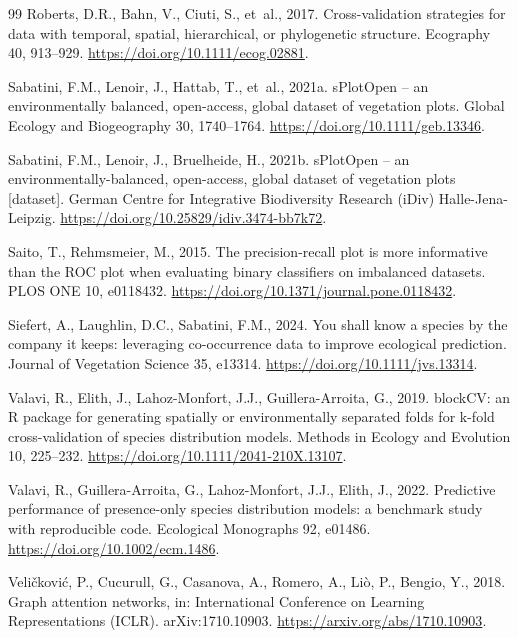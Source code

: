 \documentclass[a4paper,fleqn]{cas-sc}
\begin{document}
\begin{thebibliography}{99}
 Roberts, D.R., Bahn, V., Ciuti, S., et~al., 2017. Cross-validation strategies for data with temporal, spatial, hierarchical, or phylogenetic structure. Ecography 40, 913--929. \url{https://doi.org/10.1111/ecog.02881}.

 Sabatini, F.M., Lenoir, J., Hattab, T., et~al., 2021a. sPlotOpen -- an environmentally balanced, open-access, global dataset of vegetation plots. Global Ecology and Biogeography 30, 1740--1764. \url{https://doi.org/10.1111/geb.13346}.

 Sabatini, F.M., Lenoir, J., Bruelheide, H., 2021b. sPlotOpen -- an environmentally-balanced, open-access, global dataset of vegetation plots [dataset]. German Centre for Integrative Biodiversity Research (iDiv) Halle-Jena-Leipzig. \url{https://doi.org/10.25829/idiv.3474-bb7k72}.

 Saito, T., Rehmsmeier, M., 2015. The precision-recall plot is more informative than the ROC plot when evaluating binary classifiers on imbalanced datasets. PLOS ONE 10, e0118432. \url{https://doi.org/10.1371/journal.pone.0118432}.

 Siefert, A., Laughlin, D.C., Sabatini, F.M., 2024. You shall know a species by the company it keeps: leveraging co-occurrence data to improve ecological prediction. Journal of Vegetation Science 35, e13314. \url{https://doi.org/10.1111/jvs.13314}.

 Valavi, R., Elith, J., Lahoz-Monfort, J.J., Guillera-Arroita, G., 2019. blockCV: an R package for generating spatially or environmentally separated folds for k-fold cross-validation of species distribution models. Methods in Ecology and Evolution 10, 225--232. \url{https://doi.org/10.1111/2041-210X.13107}.

 Valavi, R., Guillera-Arroita, G., Lahoz-Monfort, J.J., Elith, J., 2022. Predictive performance of presence-only species distribution models: a benchmark study with reproducible code. Ecological Monographs 92, e01486. \url{https://doi.org/10.1002/ecm.1486}.

 Veli\v{c}kovi\'c, P., Cucurull, G., Casanova, A., Romero, A., Li\`o, P., Bengio, Y., 2018. Graph attention networks, in: International Conference on Learning Representations (ICLR). arXiv:1710.10903. \url{https://arxiv.org/abs/1710.10903}.


\end{thebibliography}
\end{document}
